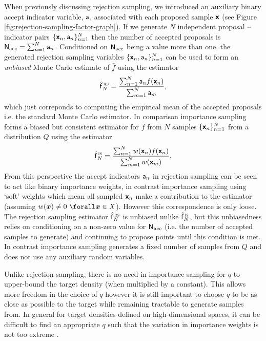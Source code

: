 When previously discussing rejection sampling, we introduced an auxiliary binary accept indicator variable, $\mathsf{a}$, associated with each proposed sample $\boldsymbol{\mathsf{x}}$ (see Figure \ref{fig:rejection-sampling-factor-graph}). If we generate $N$ independent proposal -- indicator pairs $\lbrace \boldsymbol{\mathsf{x}}_n, \mathsf{a}_n \rbrace_{n=1}^N$ then the number of accepted proposals is $\mathsf{N}_{\textrm{acc}} = \sum_{n=1}^N \mathsf{a}_n$. Conditioned on $\mathsf{N}_{\textrm{acc}}$ being a value more than one, the generated rejection sampling variables $\lbrace \boldsymbol{\mathsf{x}}_n, \mathsf{a}_n \rbrace_{n=1}^N$ can be used to form an \emph{unbiased} Monte Carlo estimate of $\bar{f}$ using the estimator
\begin{equation}\label{eq:rejection-sampler-mc-estimator}
  \hatf_N^{\,\textsc{rs}} = \frac{\sum_{n=1}^N\rvar{a}_n f\lpa\rvct{x}_n\rpa}{\sum_{m=1}^N \rvar{a}_m},
\end{equation}
which just correponds to computing the empirical mean of the accepted proposals i.e. the standard Monte Carlo estimator. In comparison importance sampling forms a biased but consistent estimator for $\bar{f}$ from $N$ samples $\lbrace \boldsymbol{\mathsf{x}}_n \rbrace_{n=1}^N$ from a distribution $Q$ using the estimator
\begin{equation}\label{eq:importance-sampler-mc-estimator}
  \hatf_N^{\,\textsc{is}} = \frac{\sum_{n=1}^N w\lpa\rvct{x}_n\rpa f\lpa\rvct{x}_n\rpa}{\sum_{m=1}^N w\lpa\rvct{x}_m\rpa}.
\end{equation}
From this perspective the accept indicators $\mathsf{a}_n$ in rejection sampling can be seen to act like binary importance weights, in contrast importance sampling using `soft' weights which mean all sampled $\boldsymbol{\mathsf{x}}_n$ make a contribution to the estimator (assuming $w(\vct{x}) \neq 0 ~\forall \vct{x} \in \set{X}$). However this correspondence is only loose. The rejection sampling estimator $\hatf_N^{\,\textsc{rs}}$ is unbiased unlike $\hatf_N^{\,\textsc{is}}$, but this unbiasedness relies on conditioning on a non-zero value for $\mathsf{N}_{\textrm{acc}}$ (i.e. the number of accepted samples to generate) and continuing to propose points until this condition is met. In contrast importance sampling generates a fixed number of samples from $Q$ and does not use any auxiliary random variables.

Unlike rejection sampling, there is no need in importance sampling for $q$ to upper-bound the target density (when multiplied by a constant). This allows more freedom in the choice of $q$ however it is still important to choose $q$ to be as close as possible to the target while remaining tractable to generate samples from. In general for target densities defined on high-dimensional spaces, it can be difficult to find an appropriate $q$ such that the variation in importance weights is not too extreme \citep{mackay2003information}. %

